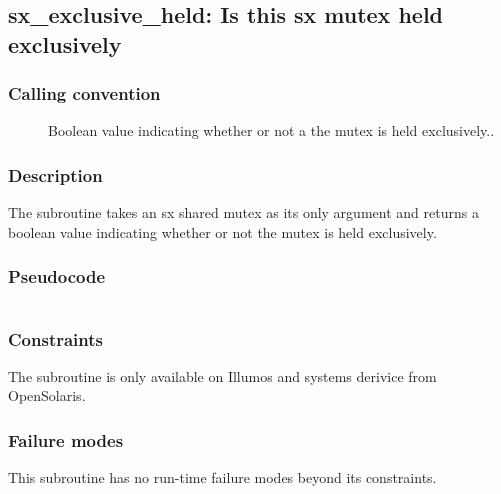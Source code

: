 \clearpage
{}
{}
\label{subr:sx-exclusive-held}
\subsection*{sx\_exclusive\_held: Is this sx mutex held exclusively }

\subsubsection*{Calling convention}

\begin{description}
\item[] Boolean value indicating whether or not a
  the mutex is held exclusively..
\end{description}

\subsubsection*{Description}

The  subroutine takes an sx shared mutex
as its only argument and returns a boolean value indicating whether or
not the mutex is held exclusively.
\subsubsection*{Pseudocode}

\begin{verbatim}
\end{verbatim}

\subsubsection*{Constraints}

The  subroutine is only available on Illumos and
systems derivice from OpenSolaris.

\subsubsection*{Failure modes}

This subroutine has no run-time failure modes beyond its constraints.
